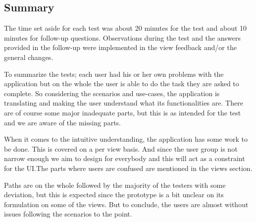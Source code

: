 \subsection{Summary}
The time set aside for each test was about 20 minutes for the test and about 10 minutes for follow-up questions. Observations during the test and the answers provided in the follow-up were implemented in the view feedback and/or the general changes.\newline

To summarize the tests; each user had his or her own problems with the application but on the whole the user is able to do the task they are asked to complete. So considering the scenarios and use-cases, the application is translating and making the user understand what its functionalities are. There are of course some major inadequate parts, but this is as intended for the test and we are aware of the missing parts.\newline

When it comes to the intuitive understanding, the application has some work to be done. This is covered on a per view basis. And since the user group is not narrow enough we aim to design for everybody and this will act as a constraint for the UI.The parts where users are confused are mentioned in the views section.\newline

Paths are on the whole followed by the majority of the testers with some deviation, but this is expected since the prototype is a bit unclear on its formulation on some of the views. But to conclude, the users are almost without issues following the scenarios to the point.

\cleardoublepage